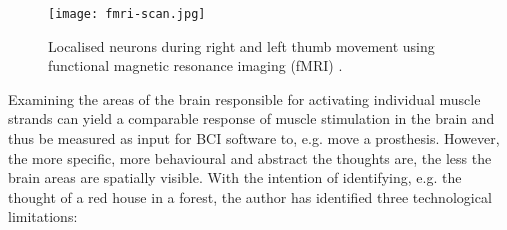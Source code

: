 \begin{figure}[ht]
  \centering
  \texttt{[image: fmri-scan.jpg]}
  \caption{Localised neurons during right and left thumb movement using functional magnetic resonance imaging (fMRI) \citep{rashid_bilateral_2018}.}
  \label{fig:fmri-scan}
\end{figure}

Examining the areas of the brain responsible for activating individual muscle strands can yield a comparable response of muscle stimulation in the brain and thus be measured as input for BCI software to, e.g. move a prosthesis. However, the more specific, more behavioural and abstract the thoughts are, the less the brain areas are spatially visible. With the intention of identifying, e.g. the thought of a red house in a forest, the author has identified three technological limitations:

